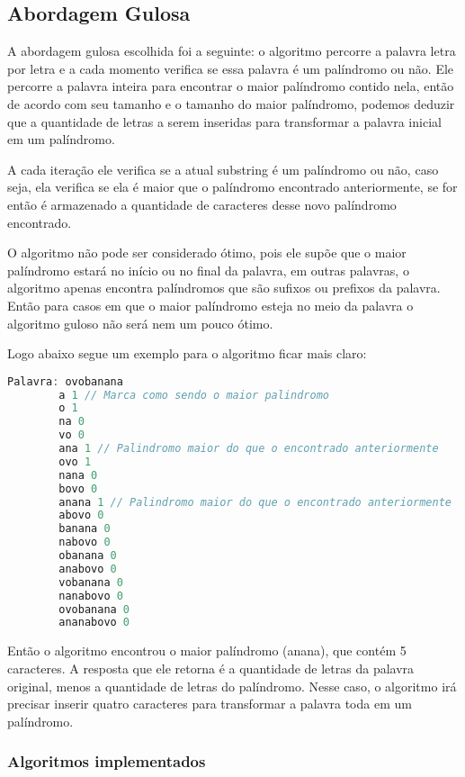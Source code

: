 \documentclass[12pt]{article}
\begin{document}
\subsection{Abordagem Gulosa}
\label{gulosa}

A abordagem gulosa escolhida foi a seguinte: o algoritmo percorre a palavra letra por letra e a cada momento verifica se essa palavra é um palíndromo ou não. Ele percorre a palavra inteira para encontrar o maior palíndromo contido nela, então de acordo com seu tamanho e o tamanho do maior palíndromo, podemos deduzir que a quantidade de letras a serem inseridas para transformar a palavra inicial em um palíndromo.

A cada iteração ele verifica se a atual substring é um palíndromo ou não, caso seja, ela verifica se ela é maior que o palíndromo encontrado anteriormente, se for então é armazenado a quantidade de caracteres desse novo palíndromo encontrado.

O algoritmo não pode ser considerado ótimo, pois ele supõe que o maior palíndromo estará no início ou no final da palavra, em outras palavras, o algoritmo apenas encontra palíndromos que são sufixos ou prefixos da palavra. Então para casos em que o maior palíndromo esteja no meio da palavra o algoritmo guloso não será nem um pouco ótimo.

Logo abaixo segue um exemplo para o algoritmo ficar mais claro:

    \begin{lstlisting}[language=c]
        Palavra: ovobanana
        a 1 // Marca como sendo o maior palindromo
        o 1
        na 0
        vo 0
        ana 1 // Palindromo maior do que o encontrado anteriormente
        ovo 1
        nana 0
        bovo 0
        anana 1 // Palindromo maior do que o encontrado anteriormente
        abovo 0
        banana 0
        nabovo 0
        obanana 0
        anabovo 0
        vobanana 0
        nanabovo 0
        ovobanana 0
        ananabovo 0
    \end{lstlisting}

    Então o algoritmo encontrou o maior palíndromo (anana), que contém 5 caracteres. A resposta que ele retorna é a quantidade de letras da palavra original, menos a quantidade de letras do palíndromo. Nesse caso, o algoritmo irá precisar inserir quatro caracteres para transformar a palavra toda em um palíndromo.

\subsubsection{Algoritmos implementados}
\end{document}
